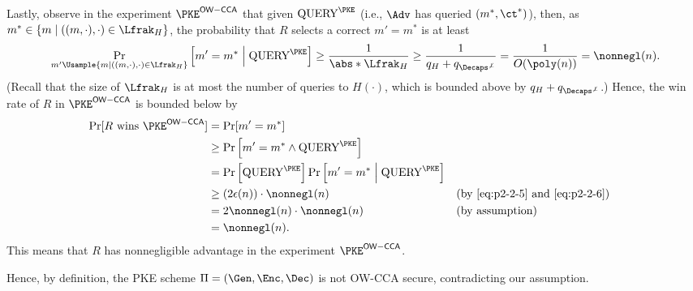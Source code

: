\begin{answer}[ii]
    Lastly, observe in the experiment $\PKE^{\mathsf{OW-CCA}}$ that given $\textrm{QUERY}^\PKE$ (i.e., $\Adv$ has queried $(m^\ast, \ct^\ast)$), then, as $m^\ast\in\{m\mid ((m,\cdot),\cdot)\in\Lfrak_H \}$, the probability that $R$ selects a correct $m'=m^\ast$ is at least 
    \begin{equation}\label{eq:p2-2-6}
        \Pr_{m'\Usample \{m\mid ((m,\cdot),\cdot)\in\Lfrak_H \}}\left[m'=m^\ast \Bigm\vert \textrm{QUERY}^\PKE\right]
        \ge \frac{1}{\abs*{\Lfrak_H}}\ge \frac{1}{q_H+q_{\Decaps^{\not\bot}}}=\frac{1}{O(\poly(n))}=\nonnegl(n).
    \end{equation}
    (Recall that the size of $\Lfrak_H$ is at most the number of queries to $H(\cdot)$, which is bounded above by $q_H+q_{\Decaps^{\not\bot}}$.) Hence, the win rate of $R$ in $\PKE^{\mathsf{OW-CCA}}$ is bounded below by
    \begin{align*}
        \Pr[R \textrm{ wins } \PKE^{\mathsf{OW-CCA}}]
        &= \Pr[ m'=m^\ast ]\\
        &\ge \Pr\left[m'=m^\ast \land \textrm{QUERY}^\PKE\right]\\
        &= \Pr\left[\textrm{QUERY}^\PKE\right]\Pr\left[m'=m^\ast \Bigm\vert \textrm{QUERY}^\PKE\right]\\
        &\ge (2\epsilon(n)) \cdot \nonnegl(n)
        && (\textrm{by \eqref{eq:p2-2-5} and \eqref{eq:p2-2-6}})\\
        &= 2\nonnegl(n)\cdot \nonnegl(n)
        && (\textrm{by assumption})\\
        &= \nonnegl(n).
    \end{align*}
    This means that $R$ has nonnegligible advantage in the experiment $\PKE^{\mathsf{OW-CCA}}$.

    Hence, by definition, the PKE scheme $\Pi= (\Gen, \Enc, \Dec)$ is not OW-CCA secure, contradicting our assumption.
\end{answer}